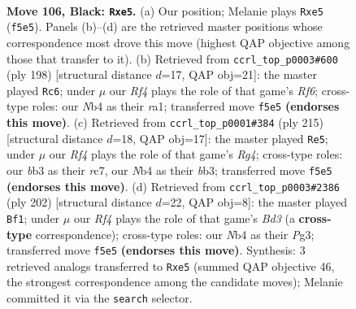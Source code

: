 \documentclass[11pt]{article}
\begin{document}
\clearpage

\begin{figure}[p]\centering
\begin{subfigure}{0.46\textwidth}\centering
\resizebox{\linewidth}{!}{%
\newchessgame
\chessboard[
  setfen={5k2/5p2/6p1/4Pr2/1n6/1B4K1/8/8 b - - 0 106},
  showmover=false,
  pgfstyle=straightmove, color=movearrow, markmove={f5-e5}
]}
\caption{}
\end{subfigure}\hfill
\begin{subfigure}{0.46\textwidth}\centering
\resizebox{\linewidth}{!}{%
\newchessgame
\chessboard[
  setfen={6k1/5p2/5R2/6PK/5P2/8/8/r7 w - - 17 100},
  showmover=false,
  pgfstyle=straightmove, color=movearrow, markmove={f6-c6}
]}
\caption{}
\end{subfigure}
\\[4pt]
\begin{subfigure}{0.46\textwidth}\centering
\resizebox{\linewidth}{!}{%
\newchessgame
\chessboard[
  setfen={8/2R2pk1/4p3/6r1/8/1B3KP1/8/8 b - - 71 108},
  showmover=false,
  pgfstyle=straightmove, color=movearrow, markmove={g5-e5}
]}
\caption{}
\end{subfigure}\hfill
\begin{subfigure}{0.46\textwidth}\centering
\resizebox{\linewidth}{!}{%
\newchessgame
\chessboard[
  setfen={1b6/6k1/8/8/5P2/3B1KP1/8/8 w - - 15 102},
  showmover=false,
  pgfstyle=straightmove, color=movearrow, markmove={d3-f1}
]}
\caption{}
\end{subfigure}
\caption{\textbf{Move 106, Black: \texttt{Rxe5}.} (a) Our position; Melanie plays \texttt{Rxe5} (\texttt{f5e5}). Panels (b)--(d) are the retrieved master positions whose correspondence most drove this move (highest QAP objective among those that transfer to it). (b) Retrieved from \texttt{ccrl\_top\_p0003\#600} (ply 198) [structural distance $d$=17, QAP obj=21]: the master played \texttt{Rc6}; under $\mu$ our \emph{Rf4} plays the role of that game's \emph{Rf6}; cross-type roles: our \emph{N}b4 as their \emph{r}a1; transferred move \texttt{f5e5} \textbf{(endorses this move)}. (c) Retrieved from \texttt{ccrl\_top\_p0001\#384} (ply 215) [structural distance $d$=18, QAP obj=17]: the master played \texttt{Re5}; under $\mu$ our \emph{Rf4} plays the role of that game's \emph{Rg4}; cross-type roles: our \emph{b}b3 as their \emph{r}c7, our \emph{N}b4 as their \emph{b}b3; transferred move \texttt{f5e5} \textbf{(endorses this move)}. (d) Retrieved from \texttt{ccrl\_top\_p0003\#2386} (ply 202) [structural distance $d$=22, QAP obj=8]: the master played \texttt{Bf1}; under $\mu$ our \emph{Rf4} plays the role of that game's \emph{Bd3} (a \textbf{cross-type} correspondence); cross-type roles: our \emph{N}b4 as their \emph{P}g3; transferred move \texttt{f5e5} \textbf{(endorses this move)}. Synthesis: 3 retrieved analogs transferred to \texttt{Rxe5} (summed QAP objective 46, the strongest correspondence among the candidate moves); Melanie committed it via the \texttt{search} selector.}
\label{fig:thought-m211}
\end{figure}
\end{document}
